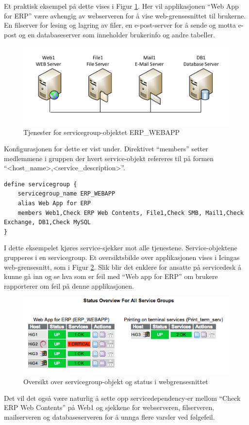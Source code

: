 Et praktisk eksempel på dette vises i Figur \ref{servicegroup_layout}. Her vil applikasjonen ``Web App for ERP'' være avhengig av webserveren for å vise web-grensesnittet til brukerne. En filserver for lesing og lagring av filer, en e-post-server for å sende og motta e-post og en databaseserver som inneholder brukerinfo og andre tabeller. 

\begin{figure}[H]
    \centering
    \includegraphics[scale=0.6]{img/servicegroup_layout}
    \caption{Tjenester for servicegroup-objektet ERP\_WEBAPP}
    \label{servicegroup_layout}
\end{figure}

Konfigurasjonen for dette er vist under. Direktivet ``members'' setter medlemmene i gruppen der hvert service-objekt refereres til på formen ``<host\_name>,<service\_description>''.

\begin{lstlisting}[style=example]
define servicegroup {
	servicegroup_name ERP_WEBAPP
	alias Web App for ERP
	members Web1,Check ERP Web Contents, File1,Check SMB, Mail1,Check Exchange, DB1,Check MySQL
}
\end{lstlisting}

I dette eksempelet kjøres service-sjekker mot alle tjenestene. Service-objektene grupperes i en servicegroup. Et oversiktsbilde over applikasjonen vises i Icingas web-grensesnitt, som i Figur \ref{servicegroup_web}. Slik blir det enklere for ansatte på servicedesk å kunne gå inn og se hva som er feil med ``Web app for ERP'' om brukere rapporterer om feil på denne applikasjonen.

\begin{figure}[H]
    \centering
    \includegraphics[scale=0.6]{img/servicegroup_web}
    \caption{ Oversikt over servicegroup-objekt og status i webgrensesnittet}
    \label{servicegroup_web}
\end{figure}
Det vil det også være naturlig å sette opp servicedependency-er mellom ``Check ERP Web Contents'' på Web1 og sjekkene for webserveren, filserveren, mailserveren og databaseserveren for å unnga flere varsler ved følgefeil.

